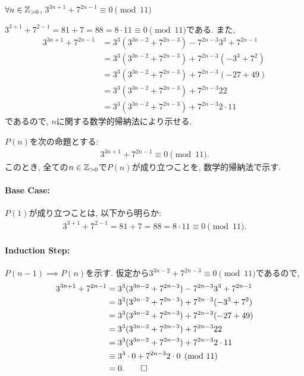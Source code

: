 \begin{prop}
  \label{p:20230805}
  $\forall n\in\mathbb{Z}_{>0}$,
  $3^{3n+1}+7^{2n-1}\equiv 0\pmod{11}$
\end{prop}
\begin{proof**}
  $3^{3+1}+7^{2-1}=81+7=88=8\cdot 11\equiv 0\pmod{11}$である.
  また,
  \begin{align*}
    3^{3n+1}+7^{2n-1}
    &=3^3(3^{3n-2}+7^{2n-3})-7^{2n-3}3^3+7^{2n-1}\\
    &=3^3(3^{3n-2}+7^{2n-3})+7^{2n-3}(-3^3+7^2)\\
    &=3^3(3^{3n-2}+7^{2n-3})+7^{2n-3}(-27+49)\\
    &=3^3(3^{3n-2}+7^{2n-3})+7^{2n-3}22\\
    &=3^3(3^{3n-2}+7^{2n-3})+7^{2n-3}2\cdot 11
  \end{align*}
  であるので,
  $n$に関する数学的帰納法により示せる.
\end{proof**}

\begin{proof*}
  $P(n)$を次の命題とする:
  \begin{align*}
    3^{3n+1}+7^{2n-1}\equiv 0\pmod{11}
    .
  \end{align*}
  このとき,
  全ての$n\in\mathbb{Z}_{>0}$で$P(n)$が成り立つことを,
  数学的帰納法で示す.

  \paragraph{Base Case:}
  $P(1)$が成り立つことは, 以下から明らか:
  \begin{align*}
    3^{3+1}+7^{2-1}=81+7=88=8\cdot 11\equiv 0\pmod{11}.
  \end{align*}

  \paragraph{Induction Step:}
  $P(n-1)\implies P(n)$を示す.
  仮定から$3^{3n-2}+7^{2n-3}\equiv 0\pmod{11}$であるので,
  \begin{align*}
    3^{3n+1}+7^{2n-1}
    &=3^3(3^{3n-2}+7^{2n-3})-7^{2n-3}3^3+7^{2n-1}\\
    &=3^3(3^{3n-2}+7^{2n-3})+7^{2n-3}(-3^3+7^2)\\
    &=3^3(3^{3n-2}+7^{2n-3})+7^{2n-3}(-27+49)\\
    &=3^3(3^{3n-2}+7^{2n-3})+7^{2n-3}22\\
    &=3^3(3^{3n-2}+7^{2n-3})+7^{2n-3}2\cdot 11\\
    &\equiv 3^3\cdot 0+7^{2n-3}2\cdot 0\pmod{11}\\
    &=0
    .\qedhere
  \end{align*}
\end{proof*}

